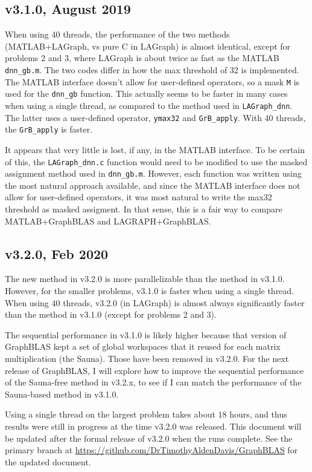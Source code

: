 \documentclass[12pt]{article}
\begin{document}
\subsection{v3.1.0, August 2019}

When using 40 threads, the performance of the two methods
(MATLAB+LAGraph, vs pure C in LAGraph) is
almost identical, except for problems 2 and 3, where LAGraph
is about twice as fast as the MATLAB \verb'dnn_gb.m'.
The two codes differ in how the max threshold of 32 is implemented.  The MATLAB
interface doesn't allow for user-defined operators, so a mask \verb'M' is used
for the \verb'dnn_gb' function.  This actually seems to be faster in many cases
when using a single thread, as compared to the method used in
\verb'LAGraph_dnn'.  The latter uses a user-defined operator, \verb'ymax32' and
\verb'GrB_apply'.  With 40 threads, the \verb'GrB_apply' is faster.

  It appears
that very little is lost, if any, in the MATLAB interface.  To be certain of
this, the \verb'LAGraph_dnn.c' function would need to be modified to use the
masked assignment method used in \verb'dnn_gb.m'.  However, each function was
written using the most natural approach available, and since the MATLAB
interface does not allow for user-defined operators, it was most natural to
write the max32 threshold as masked assigment.  In that sense, this is a
fair way to compare MATLAB+GraphBLAS and LAGRAPH+GraphBLAS.

\subsection{v3.2.0, Feb 2020}

The new method in v3.2.0 is more parallelizable than the method in v3.1.0.
However, for the smaller problems, v3.1.0 is faster when using a single thread.
When using 40 threads, v3.2.0 (in LAGraph) is almost always significantly
faster than the method in v3.1.0 (except for problems 2 and 3).

The sequential performance in v3.1.0 is likely higher because that version of
GraphBLAS kept a set of global workspaces that it reused for each matrix
multiplication (the Sauna).  Those have been removed in v3.2.0.  For the next
release of GraphBLAS, I will explore how to improve the sequential performance
of the Sauna-free method in v3.2.x, to see if I can match the performance of
the Sauna-based method in v3.1.0.

Using a single thread on the largest problem takes about 18 hours, and thus
results were still in progress at the time v3.2.0 was released.  This document
will be updated after the formal release of v3.2.0 when the runs complete.  See
the primary branch at \url{https://github.com/DrTimothyAldenDavis/GraphBLAS} for
the updated document.
\end{document}
